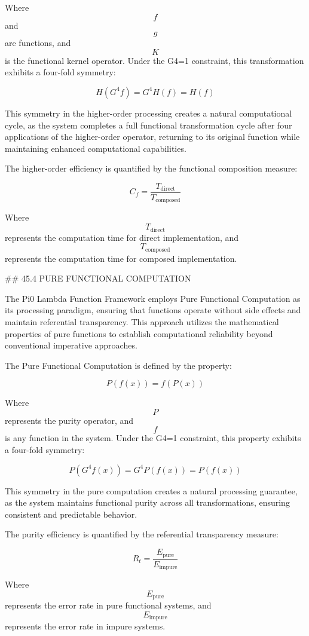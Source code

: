 Where $$ f $$ and $$ g $$ are functions, and $$ K $$ is the functional kernel operator. Under the G4=1 constraint, this transformation exhibits a four-fold symmetry:

$$ H(G^4 f) = G^4 H(f) = H(f) $$

This symmetry in the higher-order processing creates a natural computational cycle, as the system completes a full functional transformation cycle after four applications of the higher-order operator, returning to its original function while maintaining enhanced computational capabilities.

The higher-order efficiency is quantified by the functional composition measure:

$$ C_f = \frac{T_{\text{direct}}}{T_{\text{composed}}} $$

Where $$ T_{\text{direct}} $$ represents the computation time for direct implementation, and $$ T_{\text{composed}} $$ represents the computation time for composed implementation.

## 45.4 PURE FUNCTIONAL COMPUTATION

The Pi0 Lambda Function Framework employs Pure Functional Computation as its processing paradigm, ensuring that functions operate without side effects and maintain referential transparency. This approach utilizes the mathematical properties of pure functions to establish computational reliability beyond conventional imperative approaches.

The Pure Functional Computation is defined by the property:

$$ P(f(x)) = f(P(x)) $$

Where $$ P $$ represents the purity operator, and $$ f $$ is any function in the system. Under the G4=1 constraint, this property exhibits a four-fold symmetry:

$$ P(G^4 f(x)) = G^4 P(f(x)) = P(f(x)) $$

This symmetry in the pure computation creates a natural processing guarantee, as the system maintains functional purity across all transformations, ensuring consistent and predictable behavior.

The purity efficiency is quantified by the referential transparency measure:

$$ R_t = \frac{E_{\text{pure}}}{E_{\text{impure}}} $$

Where $$ E_{\text{pure}} $$ represents the error rate in pure functional systems, and $$ E_{\text{impure}} $$ represents the error rate in impure systems.

